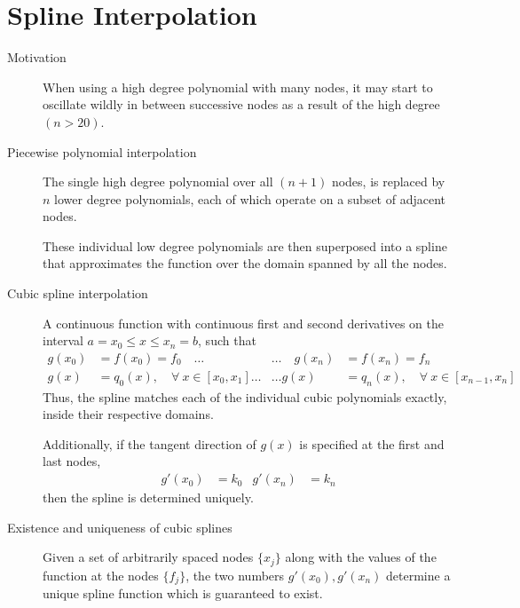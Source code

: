 \begin{description}
\end{description}

\section{Spline Interpolation}

\begin{description}
    \item[Motivation] When using a high degree polynomial with many nodes,
        it may start to oscillate wildly in between successive nodes as a result of the
        high degree $ (n > 20) $. \par

    \item[Piecewise polynomial interpolation] The single high degree polynomial over
        all $ (n+1) $ nodes, is replaced by $ n $ lower degree polynomials, each of which
        operate on a subset of adjacent nodes. \par
        These individual low degree polynomials are then superposed into a spline that
        approximates the function over the domain spanned by all the nodes.

    \item[Cubic spline interpolation] A continuous function with continuous first and
        second derivatives on the interval $ a = x_0 \leq x \leq x_n = b $,
        such that
        \begin{align}
            g(x_0)             & = f(x_0) = f_0 \quad \dots                      &
            \dots \quad g(x_n) & = f(x_n) = f_n                                    \\
            g(x)               & = q_0(x), \quad \forall\ x \in [x_0, x_1] \dots &
            \dots g(x)         & = q_n(x), \quad \forall\ x \in [x_{n-1}, x_n]
        \end{align}
        Thus, the spline matches each of the individual cubic polynomials exactly,
        inside their respective domains. \par
        Additionally, if the tangent direction of $ g(x) $ is specified at the first
        and last nodes,
        \begin{align}
            g'(x_0) & = k_0 & g'(x_n) & = k_n
        \end{align}
        then the spline is determined uniquely.

    \item[Existence and uniqueness of cubic splines] Given a set of arbitrarily spaced
        nodes $ \{x_j\} $ along with the values of the function at the nodes $ \{f_j\} $,
        the two numbers $ g'(x_0), g'(x_n) $ determine a unique spline function which is
        guaranteed to exist.


\end{description}
